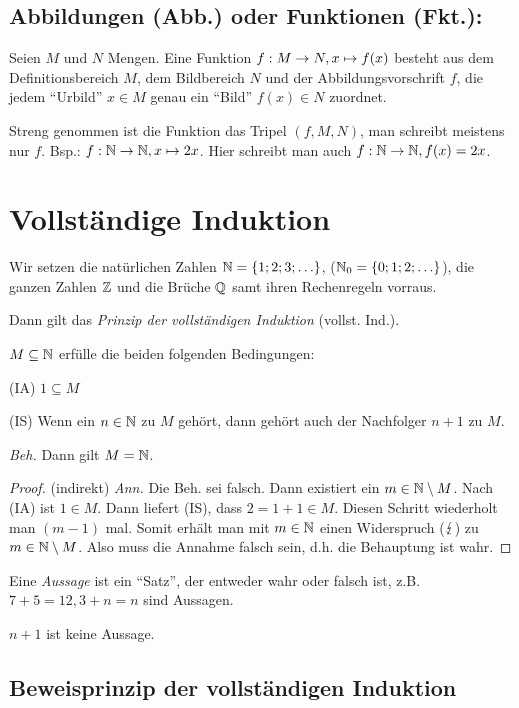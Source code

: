 \documentclass[12pt]{scrreprt}
\begin{document}
\subsection{Abbildungen (Abb.) oder Funktionen (Fkt.):}
Seien $M$ und $N$ Mengen. Eine Funktion $f: M \rightarrow N, x \mapsto f(x)$ besteht aus dem Definitions\-bereich $M$, dem Bildbereich $N$ und der Abbildungsvorschrift $f$, die jedem "`Urbild"' $x \in M$ genau ein "`Bild"' $f(x) \in N$ zuordnet.

Streng genommen ist die Funktion das Tripel $(f, M, N)$, man schreibt meistens nur $f$. Bsp.: $f: \mathbb{N} \rightarrow \mathbb{N}, x \mapsto 2x$. Hier schreibt man auch $f: \mathbb{N} \rightarrow \mathbb{N}, f(x) = 2x$.

\section{Vollständige Induktion}
\label{sec:vor.vollstInd}
Wir setzen die natürlichen Zahlen $\mathbb{N} = \{1; 2; 3; \ldots\}$, ($\mathbb{N}_0 = \{0; 1; 2; \ldots\}$), die ganzen Zahlen $\mathbb{Z}$ und die Brüche $\mathbb{Q}$ samt ihren Rechenregeln vorraus.

Dann gilt das \textit{Prinzip der vollständigen Induktion} (vollst. Ind.).

$M \subseteq \mathbb{N}$ erfülle die beiden folgenden Bedingungen:

(IA) $1 \subseteq M$

(IS) Wenn ein $n\in\mathbb{N}$ zu $M$ gehört, dann gehört auch der Nachfolger $n + 1$ zu $M$.

\noindent\textit{Beh.} Dann gilt $M = \mathbb{N}$.
\begin{proof}
(indirekt) \textit{Ann.} Die Beh. sei falsch. Dann existiert ein $m\in\mathbb{N} \setminus M$. Nach (IA) ist $1 \in M$. Dann liefert (IS), dass $2 = 1 + 1 \in M$. Diesen Schritt wiederholt man $(m - 1)$ mal. Somit erhält man mit $m\in\mathbb{N}$ einen Widerspruch ($\lightning$) zu $m\in\mathbb{N} \setminus M$. Also muss die Annahme falsch sein, d.h. die Behauptung ist wahr.
\end{proof}

Eine \textit{Aussage} ist ein "`Satz"', der entweder wahr oder falsch ist, z.B. $7 + 5 = 12, 3 + n = n$ sind Aussagen.

$n + 1$ ist keine Aussage.

\subsection{Beweisprinzip der vollständigen Induktion}
\end{document}
